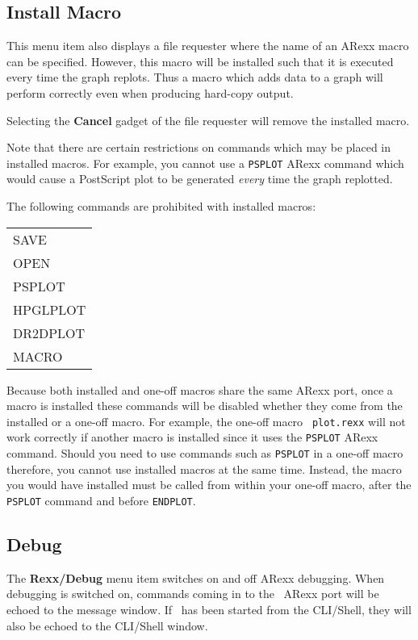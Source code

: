 \subsection{Install Macro}
This menu item also displays a file requester where the name of an ARexx 
macro can be specified. However, this macro will be installed such that 
it is executed every time the graph replots. Thus a macro which adds data 
to a graph will perform correctly even when producing hard-copy output.

Selecting the {\bf Cancel} gadget of the file requester will remove the 
installed macro.

Note that there are certain restrictions on commands which may be placed 
in installed macros. For example, you cannot use a {\tt PSPLOT} ARexx 
command which would cause a PostScript plot to be generated {\em every\/} 
time the graph replotted.

The following commands are prohibited with installed macros:
\begin{center}
\begin{tabular}{l}
SAVE     \\
OPEN     \\
PSPLOT   \\
HPGLPLOT \\
DR2DPLOT \\
MACRO    \\
\end{tabular}
\end{center}

Because both installed and one-off macros share the same ARexx port, 
once a macro is installed these commands will be disabled whether they come 
from the installed or a one-off macro. For example, the one-off macro {\tt
plot.rexx} will not work correctly if another macro is installed since it uses 
the {\tt PSPLOT} ARexx command. Should you need to use commands such as 
{\tt PSPLOT} in a one-off macro therefore, you cannot use installed 
macros at the same time. Instead, the macro you would have installed 
must be called from within your one-off macro, after the {\tt PSPLOT} command and 
before {\tt ENDPLOT}.

\subsection{Debug}
The {\bf Rexx/Debug} menu item switches on and off ARexx debugging. When 
debugging is switched on, commands coming in to the \amplot\ ARexx port 
will be echoed to the message window. If \amplot\ has been started from
the CLI/Shell, they will also be echoed to the CLI/Shell window.


